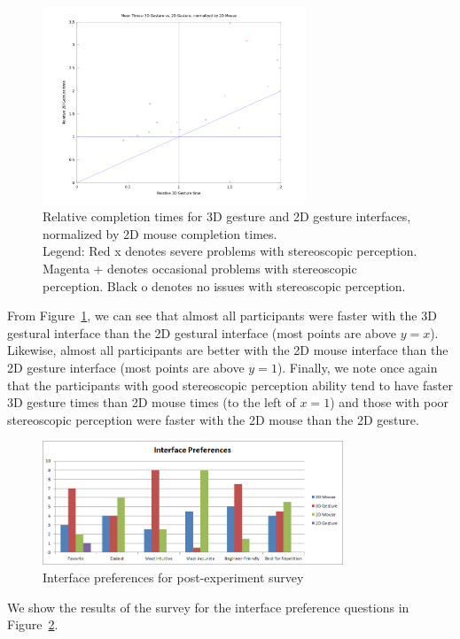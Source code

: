 \documentclass[pageno]{jpaper}
\begin{document}
\begin{figure}[h]
\centering
\includegraphics[width=0.7\textwidth]{figures/gesturebymouse2d.png}
\caption{Relative completion times for 3D gesture and 2D gesture interfaces,
normalized by 2D mouse completion times. \\
Legend: Red x denotes severe problems with stereoscopic perception. Magenta +
denotes occasional problems with stereoscopic perception. Black o denotes no
issues with stereoscopic perception.}
\label{fig:gesturevs2dm}
\end{figure}
From Figure~\ref{fig:gesturevs2dm}, we can see that almost all participants were
faster with the 3D gestural interface than the 2D gestural interface (most
points are above $y = x$). Likewise, almost all participants are better with the
2D mouse interface than the 2D gesture interface (most points are above $y=1$).
Finally, we note once again that the participants with good stereoscopic
perception ability tend to have faster 3D gesture times than 2D mouse times (to
the left of $x=1$) and those with poor stereoscopic perception were faster with
the 2D mouse than the 2D gesture.

\begin{figure}[h]
\centering
\includegraphics[width=0.8\textwidth]{figures/survey.png}
\caption{Interface preferences for post-experiment survey}
\label{fig:survey}
\end{figure}
We show the results of the survey for the interface preference questions in
Figure~\ref{fig:survey}.
\end{document}
